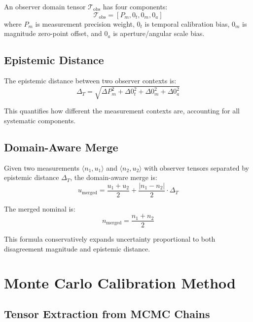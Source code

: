 \documentclass[12pt,a4paper]{article}
\begin{document}
An observer domain tensor $\mathcal{T}_{\text{obs}}$ has four components:
\begin{equation}
\mathcal{T}_{\text{obs}} = [P_m, 0_t, 0_m, 0_a]
\end{equation}
where $P_m$ is measurement precision weight, $0_t$ is temporal calibration bias, $0_m$ is magnitude zero-point offset, and $0_a$ is aperture/angular scale bias.

\subsection{Epistemic Distance}

The epistemic distance between two observer contexts is:
\begin{equation}
\Delta_T = \sqrt{\Delta P_m^2 + \Delta 0_t^2 + \Delta 0_m^2 + \Delta 0_a^2}
\end{equation}

This quantifies how different the measurement contexts are, accounting for all systematic components.

\subsection{Domain-Aware Merge}

Given two measurements $\langle n_1, u_1 \rangle$ and $\langle n_2, u_2 \rangle$ with observer tensors separated by epistemic distance $\Delta_T$, the domain-aware merge is:
\begin{equation}
u_{\text{merged}} = \frac{u_1 + u_2}{2} + \frac{|n_1 - n_2|}{2} \cdot \Delta_T
\end{equation}

The merged nominal is:
\begin{equation}
n_{\text{merged}} = \frac{n_1 + n_2}{2}
\end{equation}

This formula conservatively expands uncertainty proportional to both disagreement magnitude and epistemic distance.

\section{Monte Carlo Calibration Method}

\subsection{Tensor Extraction from MCMC Chains}
\end{document}

